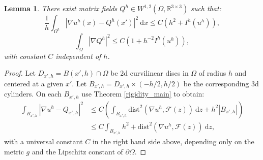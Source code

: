 \documentclass[leqno,twoside, 11pt]{amsart}
\theoremstyle{plain}
\newtheorem{lemma}[theorem]{Lemma}
\theoremstyle{definition}
\numberwithin{equation}{section}
\numberwithin{figure}{section}
\begin{document}
\begin{lemma}\label{lemapprox}
There exist matrix fields $Q^h\in W^{1,2}(\Omega,\mathbb{R}^{3\times 3})$ such that:
\begin{equation}\label{pr2} 
\frac{1}{h}\int_{\Omega^h}|\nabla u^h(x) - Q^h(x')|^2~\mathrm{d}x
\leq C (h^2 + I^h(u^h)),
\end{equation}
\begin{equation}\label{pr3} 
\int_\Omega |\nabla Q^h|^2 \leq C(1 + h^{-2}I^h(u^h)),
\end{equation}
with constant $C$ independent of $h$.
\end{lemma}
\begin{proof} 
Let $D_{x',h}=B(x',h)\cap\Omega$ be $2$d curvilinear discs
in $\Omega$ of radius $h$ and centered at a given $x'$. 
Let $B_{x',h}=D_{x',h}\times(-h/2, h/2)$ be the corresponding $3$d cylinders.
On each $B_{x',h}$ use Theorem \ref{rigidity_main} to obtain:
\begin{equation}\label{pr1}
\begin{split}
\int_{B_{x',h}} |\nabla u^h - Q_{x',h}|^2 &\leq C \left(\int_{B_{x',h}}\mbox{dist}^2
(\nabla u^h,\mathcal{F}(z))~\mbox{d}z 
+ h^2 |B_{x',h}|\right)\\
&\leq C \int_{B_{x',h}} h^2 + \mbox{dist}^2 (\nabla u^h,\mathcal{F}(z))~\mbox{d}z,
\end{split}
\end{equation}
with a universal constant $C$ in the right hand side above, depending only on 
the metric $g$ and the Lipschitz constant of $\partial\Omega$.


\end{proof}
\end{document}
